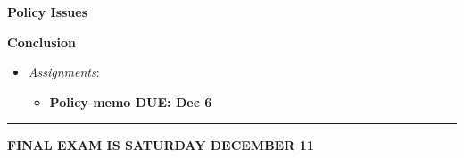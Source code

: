 \week \textbf{Policy Issues}

\week \textbf{Conclusion}

\begin{itemize}

\item
  \emph{Assignments}:

  \begin{itemize}
  
  \item
    \textbf{Policy memo DUE: Dec 6}
  \end{itemize}
\end{itemize}

\begin{center}\rule{0.5\linewidth}{0.5pt}\end{center}

\noindent \textbf{FINAL EXAM IS SATURDAY DECEMBER 11}
